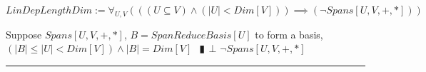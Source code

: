 \documentclass{book}
\newcommand{\abr}{:=}
\newcommand{\pipe}{$\phantom{(}\vrectangleblack\phantom{)}$}
\begin{document}
$LinDepLengthDim \abr \forall_{U, V}(((U \subseteq V) \land (|U| < Dim[V])) \implies (\lnot Spans[U, V, +, *]))$
\begin{enumerate}
  \lit Suppose $Spans[U, V, +, *]$, $B = SpanReduceBasis[U]$ to form a basis, $(|B| \leq |U| < Dim[V]) \land |B| = Dim[V]$ \pipe $\bot$
  \lit $\lnot Spans[U, V, +, *]$
\end{enumerate} \vspace{.75mm} \hrule \vspace{.75mm} \ \\ 

\begin{comment}
  $DimSub \abr \forall_{U, V}(((FinDim[V, +, *]) \land (Subspace[U, V, +, *])) \implies (Dim[U] \leq Dim[V]))$
  \begin{enumerate}
    \lit TODO ???
  \end{enumerate} \vspace{.75mm} \hrule \vspace{.75mm} \ \\ 

  $DimSum \abr \forall_{U_1, U_2, V}(((FinDim[V, +, *]) \land (Subspace[U_1, V, +, *]) \land (Subspace[U_2, V, +, *])) \\
      \implies (Dim[U_1 + U_2] = Dim[U_1] + Dim[U_2] - Dim[U_1 \cap U_2]))$
  \begin{enumerate}
    \lit TODO
  \end{enumerate} \vspace{.75mm} \hrule \vspace{.75mm} \ \\ 

  $SubDirSum \abr \forall_{U, V}(((FinDim[V, +, *]) \land (Subspace[U, V, +, *])) \implies (\exists_{W}((Subspace[W, V, +, *]) \land (DirSum[V, U, W, V, +, *]))))$
  \begin{enumerate}
    \lit $FinSubSpace$ \pipe $FinDim[U, +, *]$
    \lit $(FinDimBasis) \land (FinDim[U, +, *])$ \pipe $\exists_{B}(Basis[B, U, +, *])$ \pipe $LinInd[B, U, +, *]$ \pipe $LinInd[B, V, +, *]$ NEWTHM
    \lit $(LinIndExpandBasis) \land (LinInd[B, V, +, *])$ \pipe $\exists_{C}((B \subseteq C) \land (Basis[C, V, +, *]))$
    \lit $(LinSpanSubContains) \land (W \abr LinSpan[C \setminus B])$ \pipe $Subspace[W, V, +, *]$
    \lit $(v \in V) \implies \ldots$
    \begin{enumerate}
      \lit $v = \sum(r_i * c_i) = \sum(r_i * w_i) + \sum(r_i * b_i) \in W + U)$
    \end{enumerate}
    \lit $(v \in V) \implies (v \in U + W)$ \pipe $\forall_{v \in V}(v \in U + W)$ \pipe $SetSum[V, U, W, V +, *]$
    \lit $(v \in U \cap W) \implies \ldots$
    \begin{enumerate}
      \lit TODO : $LinInd$ \pipe $\ldots v = O$
    \end{enumerate}
    \lit $(v \in U \cap W) \iff (v = O)$ \pipe $U \cap W = \{O\}$
    \lit $(SetSum[V, U, W, V +, *]) \land (U \cap W = \{O\})$
    \lit $DirSumEquiv$ \pipe $DirSum[V, U, W, V, +, *]$
  \end{enumerate} \vspace{.75mm} \hrule \vspace{.75mm} \ \\ 
\end{comment}
\end{document}
